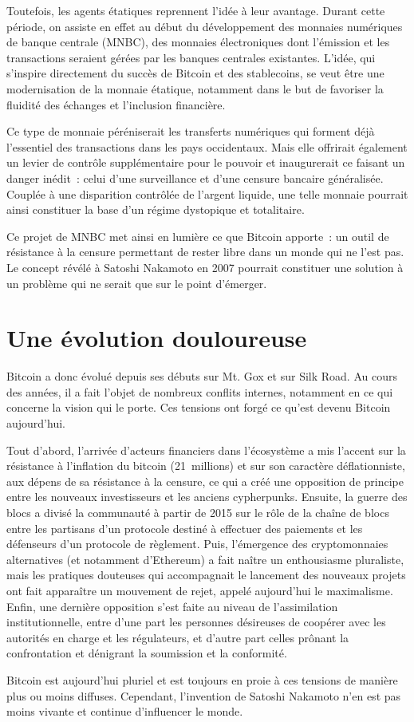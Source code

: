 Toutefois, les agents étatiques reprennent l'idée à leur avantage. Durant cette période, on assiste en effet au début du développement des monnaies numériques de banque centrale (MNBC), des monnaies électroniques dont l'émission et les transactions seraient gérées par les banques centrales existantes. L'idée, qui s'inspire directement du succès de Bitcoin et des stablecoins, se veut être une modernisation de la monnaie étatique, notamment dans le but de favoriser la fluidité des échanges et l'inclusion financière.

Ce type de monnaie péréniserait les transferts numériques qui forment déjà l'essentiel des transactions dans les pays occidentaux. Mais elle offrirait également un levier de contrôle supplémentaire pour le pouvoir et inaugurerait ce faisant un danger inédit~: celui d'une surveillance et d'une censure bancaire généralisée. Couplée à une disparition contrôlée de l'argent liquide, une telle monnaie pourrait ainsi constituer la base d'un régime dystopique et totalitaire.

Ce projet de MNBC met ainsi en lumière ce que Bitcoin apporte~: un outil de résistance à la censure permettant de rester libre dans un monde qui ne l'est pas. Le concept révélé à Satoshi Nakamoto en 2007 pourrait constituer une solution à un problème qui ne serait que sur le point d'émerger.

\section*{Une évolution douloureuse}

Bitcoin a donc évolué depuis ses débuts sur Mt. Gox et sur Silk Road. Au cours des années, il a fait l'objet de nombreux conflits internes, notamment en ce qui concerne la vision qui le porte. Ces tensions ont forgé ce qu'est devenu Bitcoin aujourd'hui. 

Tout d'abord, l'arrivée d'acteurs financiers dans l'écosystème a mis l'accent sur la résistance à l'inflation du bitcoin (21~millions) et sur son caractère déflationniste, aux dépens de sa résistance à la censure, ce qui a créé une opposition de principe entre les nouveaux investisseurs et les anciens cypherpunks. Ensuite, la guerre des blocs a divisé la communauté à partir de 2015 sur le rôle de la chaîne de blocs entre les partisans d'un protocole destiné à effectuer des paiements et les défenseurs d'un protocole de règlement. Puis, l'émergence des cryptomonnaies alternatives (et notamment d'Ethereum) a fait naître un enthousiasme pluraliste, mais les pratiques douteuses qui accompagnait le lancement des nouveaux projets ont fait apparaître un mouvement de rejet, appelé aujourd'hui le maximalisme. Enfin, une dernière opposition s'est faite au niveau de l'assimilation institutionnelle, entre d'une part les personnes désireuses de coopérer avec les autorités en charge et les régulateurs, et d'autre part celles prônant la confrontation et dénigrant la soumission et la conformité. 

Bitcoin est aujourd'hui pluriel et est toujours en proie à ces tensions de manière plus ou moins diffuses. Cependant, l'invention de Satoshi Nakamoto n'en est pas moins vivante et continue d'influencer le monde. 

\printendnotes